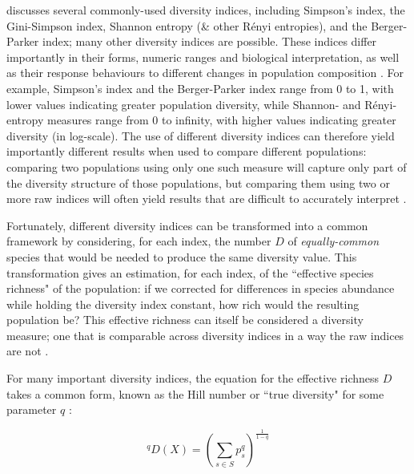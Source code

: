  discusses several commonly-used diversity indices, including Simpson's index, the Gini-Simpson index, Shannon entropy (\& other R\'{e}nyi entropies), and the Berger-Parker index; many other diversity indices are possible. These indices differ importantly in their forms, numeric ranges and biological interpretation, as well as their response behaviours to different changes in population composition \citep{peet1974diversity, jost2006entropy}. For example, Simpson's index and the Berger-Parker index range from 0 to 1, with lower values indicating greater population diversity, while Shannon- and R\'{e}nyi-entropy measures range from 0 to infinity, with higher values indicating greater diversity (in log-scale). The use of different diversity indices can therefore yield importantly different results when used to compare different populations: comparing two populations using only one such measure will capture only part of the diversity structure of those populations, but comparing them using two or more raw indices will often yield results that are difficult to accurately interpret \citep{peet1974diversity, jost2006entropy}.

Fortunately, different diversity indices can be transformed into a common framework by considering, for each index, the number $D$ of \textit{equally-common} species that would be needed to produce the same diversity value. This transformation gives an estimation, for each index, of the ``effective species richness" of the population: if we corrected for differences in species abundance while holding the diversity index constant, how rich would the resulting population be? This effective richness can itself be considered a diversity measure; one that is comparable across diversity indices in a way the raw indices are not \citep{jost2006entropy}.

For many important diversity indices, the equation for the effective richness $D$ takes a common form, known as the Hill number or ``true diversity" for some parameter $q$ \citep{hill1973diversity, jost2006entropy}:

\begin{equation}
^qD(X) = \left(\sum_{s \in S} p_s^q \right)^{\frac{1}{1-q}}
\label{eq:hill_index}
\end{equation}


